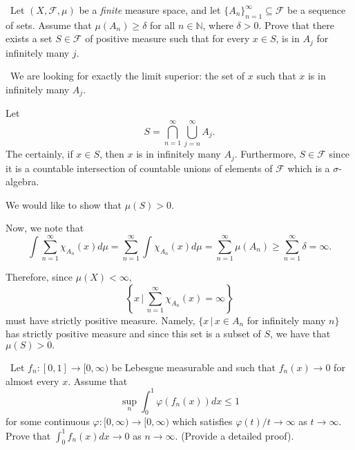 \documentclass[12pt]{Qual}
\begin{document}
\begin{problem} $\,$
Let $(X,\mathscr{F},\mu)$ be a \textit{finite} measure space, and let $\{A_n\}_{n=1}^\infty\subseteq\mathscr{F}$ be a sequence of sets. Assume that $\mu(A_n)\ge\delta$ for all $n\in\mathbb{N}$, where $\delta>0$. Prove that there exists a set $S\in\mathscr{F}$ of positive measure such that for every $x\in S$, is in $A_j$ for infinitely many $j.$
\end{problem}


\begin{solution}$\,$
 We are looking for exactly the limit superior: the set of $x$ such that $x$ is in infinitely many $A_j.$

 Let $$S=\bigcap_{n=1}^\infty\bigcup_{j=n}^\infty A_j.$$ The certainly, if $x\in S$, then $x$ is in infinitely many $A_j.$ Furthermore, $S\in\mathscr{F}$ since it is a countable intersection of countable unions  of elements of $\mathscr{F}$ which is a $\sigma$-algebra.

 We would like to show that $\mu(S)>0.$

 Now, we note that $$\int\sum_{n=1}^\infty\chi_{A_n}(x)d\mu=\sum_{n=1}^\infty\int\chi_{A_n}(x)d\mu=\sum_{n=1}^\infty\mu(A_n)\ge\sum_{n=1}^\infty\delta=\infty.$$

 Therefore, since $\mu(X)<\infty,$ $$\left\{x\,|\,\sum_{n=1}^\infty\chi_{A_n}(x)=\infty\right\}$$ must have strictly positive measure. Namely, $\{x\,|\,x\in A_n$ for infinitely many $n\}$ has strictly positive measure and since this set is a subset of $S$, we have that $\mu(S)>0.$

\end{solution}
\newpage




\begin{problem} $\,$
Let $f_n:[0,1]\to[0,\infty)$ be Lebesgue measurable and such that $f_n(x)\to0$ for almost every $x.$ Assume that $$\sup_n\int_0^1\varphi(f_n(x))dx\le 1$$ for some continuous $\varphi:[0,\infty)\to[0,\infty)$ which satisfies $\varphi(t)/t\to\infty$ as $t\to\infty.$ Prove that $\int_0^1f_n(x)dx\to0$ as $n\to\infty.$ (Provide a detailed proof).
\end{problem}
\end{document}
